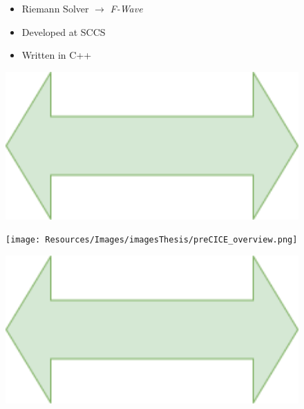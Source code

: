 
\begin{frame}

\begin{figure}
\begin{minipage}{0.15\linewidth}
\begin{tcolorbox}[title=\centering SWE solver\\2D,colframe=TUMDarkBlue,
colback=TUMDarkBlue!30]
\addtolength{\leftmargini}{-1.5em}
\begin{itemize}
\setlength{\itemsep}{5ex}
\vspace{0.5cm}
\item Riemann Solver $\rightarrow$ \textit{F-Wave}
\item Developed at SCCS
\item Written in C++
\end{itemize}
\end{tcolorbox}
\end{minipage}
\begin{minipage}{0.1\linewidth}
\includegraphics[width=1\textwidth]{Resources/Images/arrow2.png}
\end{minipage}
\begin{minipage}{0.46\linewidth}
\texttt{[image: Resources/Images/imagesThesis/preCICE\_overview.png]}
\end{minipage}
\begin{minipage}{0.1\linewidth}
\includegraphics[width=1\textwidth]{Resources/Images/arrow2.png}

\end{minipage}
\end{figure}
\end{frame}

